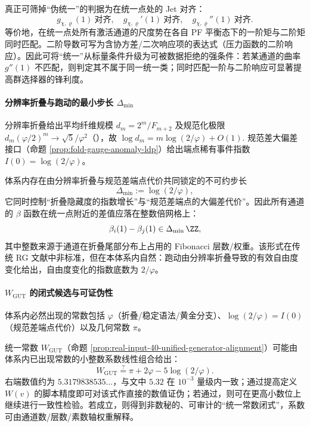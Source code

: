 \begin{proposition}\label{prop:jet-alignment-unification}
真正可筛掉“伪统一”的判据为在统一点处的 Jet 对齐：
\[
g_{\chi,\varrho}(1)\ \text{对齐},\quad
g_{\chi,\varrho}'(1)\ \text{对齐},\quad
g_{\chi,\varrho}''(1)\ \text{对齐}.
\]
等价地，在统一点处所有激活通道的尺度势在各自 PF 平衡态下的一阶矩与二阶矩同时匹配。二阶导数可写为含协方差/二次响应项的表达式（压力函数的二阶响应）。因此可将“统一”从标量条件升级为可被数据拒绝的强条件：若某通道的曲率 \(g''(1)\) 不匹配，则判定其不属于同一统一类；同时匹配一阶与二阶响应可显著提高群选择器的锋利度。
\end{proposition}

\paragraph{分辨率折叠与跑动的最小步长 \(\Delta_{\min}\)}
分辨率折叠给出平均纤维规模 \(d_m=2^m/F_{m+2}\) 及规范化极限 \(d_m(\varphi/2)^m\to\sqrt5/\varphi^2\)（\cite{Internal2025ResolutionFoldingPhiPiE}），故
\(
\log d_m=m\log(2/\varphi)+O(1).
\)
规范差大偏差接口（命题 \ref{prop:fold-gauge-anomaly-ldp}）给出端点稀有事件指数 \(I(0)=\log(2/\varphi)\)。

\begin{proposition}\label{prop:beta-quantization-step}
体系内存在由分辨率折叠与规范差端点代价共同锁定的不可约步长
\[
\Delta_{\min}:=\log(2/\varphi),
\]
它同时控制“折叠隐藏度的指数增长”与“规范差端点的大偏差代价”。因此所有通道的 \(\beta\) 函数在统一点附近的差值应落在整数倍网格上：
\[
\beta_i(1)-\beta_j(1)\in \Delta_{\min}\,\ZZ,
\]
其中整数来源于通道在折叠尾部分布上占用的 Fibonacci 层数/权重。该形式在传统 RG 文献中非标准，但在本体系内自然：跑动由分辨率折叠导致的有效自由度变化给出，自由度变化的指数底数为 \(2/\varphi\)。
\end{proposition}

\paragraph{\(W_{\mathrm{GUT}}\) 的闭式候选与可证伪性}
体系内必然出现的常数包括 \(\varphi\)（折叠/稳定语法/黄金分支）、\(\log(2/\varphi)=I(0)\)（规范差端点代价）以及几何常数 \(\pi\)。

\begin{conjecture}\label{conj:Wgut-closed-form}
统一常数 \(W_{\mathrm{GUT}}\)（命题 \ref{prop:real-input-40-unified-generator-alignment}）可能由体系内已出现常数的小整数系数线性组合给出：
\[
W_{\mathrm{GUT}}\stackrel{?}{=}\pi+2\varphi-5\log(2/\varphi).
\]
右端数值约为 \(5.3179838535\ldots\)，与文中 \(5.32\) 在 \(10^{-3}\) 量级内一致；通过提高定义 \(W(v)\) 的脚本精度即可对该式作直接的数值证伪；若通过，则可在更高小数位上继续进行一致性检验。若成立，则得到非数秘的、可审计的“统一常数闭式”，系数可由通道数/层数/素数轴权重解释。
\end{conjecture}

